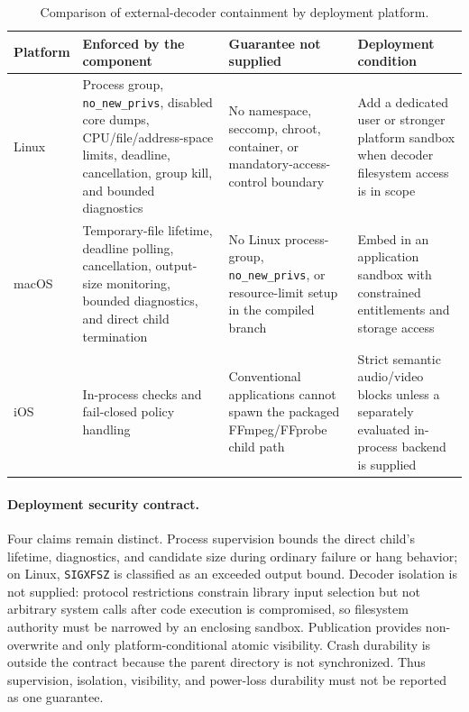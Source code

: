 \begin{table}[t]
\centering
\caption{Comparison of external-decoder containment by deployment platform.}
\label{tab:platform-containment}
\footnotesize
\begin{tabularx}{\textwidth}{L{0.10\textwidth}L{0.28\textwidth}L{0.28\textwidth}Y}
\toprule
Platform & Enforced by the component & Guarantee not supplied & Deployment condition \\
\midrule
Linux & Process group, \texttt{no\_new\_privs}, disabled core dumps, CPU/file/address-space limits, deadline, cancellation, group kill, and bounded diagnostics & No namespace, seccomp, chroot, container, or mandatory-access-control boundary & Add a dedicated user or stronger platform sandbox when decoder filesystem access is in scope \\
macOS & Temporary-file lifetime, deadline polling, cancellation, output-size monitoring, bounded diagnostics, and direct child termination & No Linux process-group, \texttt{no\_new\_privs}, or resource-limit setup in the compiled branch & Embed in an application sandbox with constrained entitlements and storage access \\
iOS & In-process checks and fail-closed policy handling & Conventional applications cannot spawn the packaged FFmpeg/FFprobe child path & Strict semantic audio/video blocks unless a separately evaluated in-process backend is supplied \\
\bottomrule
\end{tabularx}
\end{table}

\paragraph{Deployment security contract.}
Four claims remain distinct. Process supervision bounds the direct child's
lifetime, diagnostics, and candidate size during ordinary failure or hang
behavior; on Linux, \texttt{SIGXFSZ} is classified as an exceeded output bound.
Decoder isolation is not supplied: protocol restrictions constrain library
input selection but not arbitrary system calls after code execution is
compromised, so filesystem authority must be narrowed by an enclosing sandbox.
Publication provides non-overwrite and only platform-conditional atomic
visibility. Crash durability is outside the contract because the parent
directory is not synchronized. Thus supervision, isolation, visibility, and
power-loss durability must not be reported as one guarantee.

